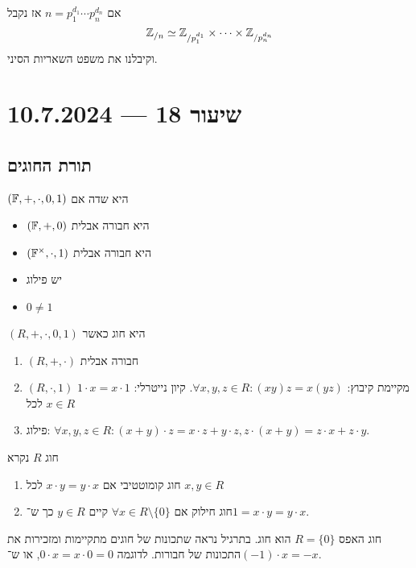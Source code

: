 \begin{example}
	אם $n = p_1^{d_1} \cdots p_n^{d_n}$ אז נקבל
	\[
		\mathbb{Z}_{/n} \simeq \mathbb{Z}_{/p_1^{d_1}} \times \cdots \times \mathbb{Z}_{/p_n^{d_n}} 
	\]
	וקיבלנו את משפט השאריות הסיני.
\end{example}

\section{שיעור 18 --- 10.7.2024}
\subsection{תורת החוגים}
\begin{remark}
	$(\mathbb{F}, +, \cdot, 0, 1)$ היא שדה אם
	\begin{itemize}
		\item $(\mathbb{F}, +, 0)$ היא חבורה אבלית
		\item $(\mathbb{F}^\times, \cdot, 1)$ היא חבורה אבלית
		\item יש פילוג
		\item $0 \ne 1$
	\end{itemize}
\end{remark}
\begin{definition}[חוג]
	$(R, +, \cdot, 0, 1)$ היא חוג כאשר
	\begin{enumerate}
		\item $(R, +, \cdot)$ חבורה אבלית
		\item $(R, \cdot, 1)$ מקיימת
			 קיבוץ: $\forall x, y, z \in R : (xy)z = x(yz)$.
			 קיון נייטרלי: $1 \cdot x = x \cdot 1$ לכל $x \in R$
		\item פילוג: $\forall x, y, z \in R : (x + y) \cdot z = x \cdot z + y \cdot z, z \cdot (x + y) = z \cdot x + z \cdot y$.
	\end{enumerate}
\end{definition}
\begin{definition}
	חוג $R$ נקרא
	\begin{enumerate}
		\item חוג קומוטטיבי אם $x \cdot y = y \cdot x$ לכל $x, y \in R$
		\item חוג חילוק אם $\forall x \in R \setminus \{ 0 \}$ קיים $y \in R$ כך ש־$1 = x \cdot y = y \cdot x$.
	\end{enumerate}
\end{definition}
חוג האפס $R = \{ 0 \}$ הוא חוג.
בתרגיל נראה שתכונות של חוגים מתקיימות ומזכירות את התכונות של חבורות.
לדוגמה $0 \cdot x = x \cdot 0 = 0$, או ש־$(-1) \cdot x = -x$.

